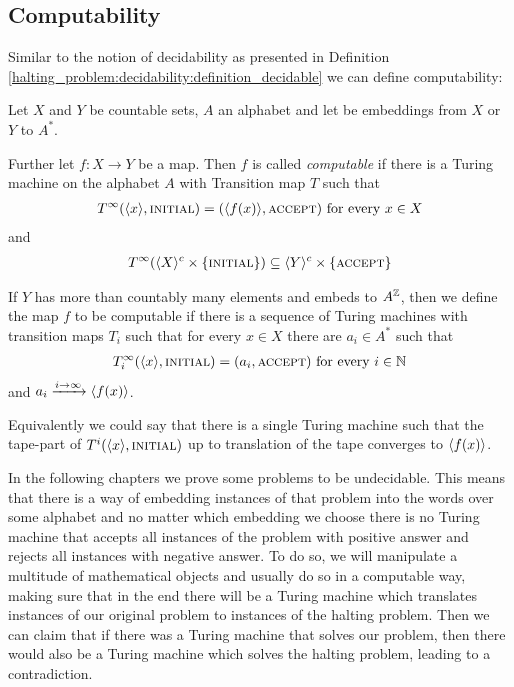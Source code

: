 \subsection{Computability}
\label{halting_problem:computability}

Similar to the notion of decidability as presented in Definition \ref{halting_problem:decidability:definition_decidable} we can define computability:

\begin{Definition}
	Let $X$ and $Y$ be countable sets, $A$ an alphabet and let \emb{\cdot} be embeddings from $X$ or $Y$ to $A^*$.

	Further let $f:X \to Y$ be a map.
	Then $f$ is called \emph{computable} if there is a Turing machine on the alphabet $A$ with Transition map $T$ such that
	\begin{align*}
		T^\infty(\langle x \rangle,\text{\scshape{initial}}) = (\langle f(x) \rangle,\text{\scshape{accept}}) ~\text{for every}~ x \in X
	\end{align*}
	and
	\begin{align*}
		T^\infty(\langle X \rangle^c \times \{\text{\scshape{initial}}\}) \subseteq \langle Y \rangle^c \times \{\text{\scshape{accept}}\}
	\end{align*}
\end{Definition}

\begin{Remark}
	If $Y$ has more than countably many elements and embeds to $A^{\mathbb{Z}}$, then we define the map $f$ to be computable if there is a sequence of Turing machines with transition maps $T_i$ such that for every $x \in X$ there are $a_i \in A^*$ such that
	\begin{align*}
		T_i^\infty(\langle x \rangle, \text{\scshape{initial}}) = (a_i,\text{\scshape{accept}}) ~\text{for every}~ i \in \mathbb{N}
	\end{align*}
	and $a_i \xrightarrow{i \to \infty} \langle f(x) \rangle$.

	Equivalently we could say that there is a single Turing machine such that the tape-part of $T^i(\langle x \rangle,\text{\scshape{initial}})$ up to translation of the tape converges to $\langle f(x) \rangle$.
\end{Remark}

In the following chapters we prove some problems to be undecidable.
This means that there is a way of embedding instances of that problem into the words over some alphabet and no matter which embedding we choose there is no Turing machine that accepts all instances of the problem with positive answer and rejects all instances with negative answer.
To do so, we will manipulate a multitude of mathematical objects and usually do so in a computable way, making sure that in the end there will be a Turing machine which translates instances of our original problem to instances of the halting problem.
Then we can claim that if there was a Turing machine that solves our problem, then there would also be a Turing machine which solves the halting problem, leading to a contradiction.

